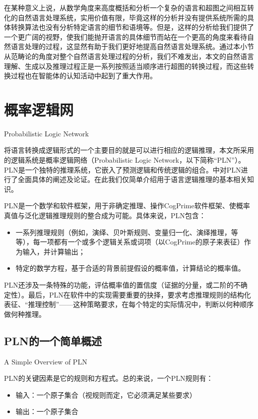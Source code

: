 在某种意义上说，从数学角度来高度概括和分析一个复杂的语言和超图之间相互转化的自然语言处理系统，实用价值有限，毕竟这样的分析并没有提供系统所需的具体转换算法也没有分析特定语言的细节和语境等。但是，这样的分析给我们提供了一个更广阔的视野，使我们能抛开语言的具体细节而站在一个更高的角度来看待自然语言处理的过程，这显然有助于我们更好地提高自然语言处理系统。通过本小节从范畴论的角度对整个自然语言处理过程的分析，我们不难发出，本文的自然语言理解、生成以及推理过程正是一系列按照适当顺序进行超图的转换过程，而这些转换过程也在智能体的认知活动中起到了重大作用。

\section{概率逻辑网}{Probabilistic Logic Network }
\label{sec:pln}

将语言转换成逻辑形式的一个主要目的就是可以进行相应的逻辑推理，本文所采用的逻辑系统是概率逻辑网络（Probabilistic Logic Network，以下简称“PLN”）。 PLN是一个独特的推理系统，它嵌入了预测逻辑和传统逻辑的组合。\cite{Goertzel2008, RWR}中对PLN进行了全面具体的阐述及论证。在此我们仅简单介绍用于语言逻辑推理的基本相关知识。

PLN是一个数学和软件框架，用于非确定推理、操作CogPrime软件框架、使概率真值与泛化逻辑推理规则的整合成为可能。具体来说，PLN包含：

\begin{itemize}
\item 一系列推理规则（例如，演绎、贝叶斯规则、变量归一化、演绎推理，等等），每一项都有一个或多个逻辑关系或词项（以CogPrime的原子来表征）作为输入，并计算输出；
\item 特定的数学方程，基于合适的背景前提假设的概率值，计算结论的概率值。
\end{itemize}
PLN还涉及一条特殊的功能，评估概率值的置信度（证据的分量，或二阶的不确定性）。最后，PLN在软件中的实现需要重要的抉择，要求考虑推理规则的结构化表征、“推理控制”——这种策略要求，在每个特定的实际情况中，判断以何种顺序做何种推理。

\subsection{PLN的一个简单概述}{A Simple Overview of PLN}

PLN的关键因素是它的规则和方程式。总的来说，一个PLN规则有：

\begin{itemize}
\item 输入：一个原子集合（视规则而定，它必须满足某些要求）
\item 输出：一个原子集合
\end{itemize}

